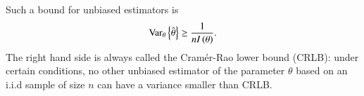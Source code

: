 Such a bound for unbiased estimators is \cite{van2004detection}
\begin{equation*}
    \text{Var}_{\theta}\left\{{\hat{\theta}}\right\}\geq\frac{1}{nI\left({\theta}\right)}.
\end{equation*}
The right hand side is always called the Cram\'er-Rao lower bound (CRLB): under certain conditions, no other unbiased estimator of the parameter $\theta$ based on an i.i.d sample of size $n$ can have a variance smaller than CRLB.
